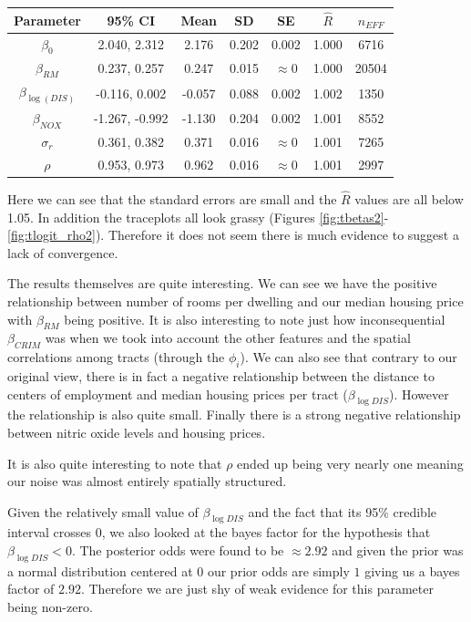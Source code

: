 \documentclass[11pt]{article}
\begin{document}
\begin{center}
\begin{tabular}{ c  | c | c | c | c | c | c}
\hline
 Parameter & 95\% CI & Mean & SD & SE & $\hat{R}$ & $n_{EFF}$ \\ 
 \hline
 $\beta_0$ & 2.040,  2.312 & 2.176 & 0.202 & 0.002 & 1.000 & 6716 \\
 $\beta_{RM}$ & 0.237, 0.257 & 0.247 & 0.015 & $\approx 0$ & 1.000 & 20504 \\
 $\beta_{\log{(DIS)}}$ & -0.116, 0.002 & -0.057 & 0.088 & 0.002 & 1.002 & 1350 \\
 $\beta_{NOX}$ & -1.267, -0.992 & -1.130 & 0.204 & 0.002 & 1.001 & 8552 \\
 $\sigma_r$ & 0.361, 0.382 & 0.371 & 0.016 & $\approx 0$ & 1.001 & 7265 \\
 $\rho$ & 0.953, 0.973 & 0.962 & 0.016 & $\approx 0$ & 1.001 & 2997 \\
 \hline
\end{tabular}
\end{center}

Here we can see that the standard errors are small and the $\hat{R}$ values are all below 1.05. In addition the traceplots all look grassy (Figures \ref{fig:tbetas2}-\ref{fig:tlogit_rho2}). Therefore it does not seem there is much evidence to suggest a lack of convergence. \newline

The results themselves are quite interesting. We can see we have the positive relationship between number of rooms per dwelling and our median housing price with $\beta_{RM}$ being positive. It is also interesting to note just how inconsequential $\beta_{CRIM}$ was when we took into account the other features and the spatial correlations among tracts (through the $\phi_i$). We can also see that contrary to our original view, there is in fact a negative relationship between the distance to centers of employment and median housing prices per tract ($\beta_{\log{DIS}}$). However the relationship is also quite small. Finally there is a strong negative relationship between nitric oxide levels and housing prices. 

It is also quite interesting to note that $\rho$ ended up being very nearly one meaning our noise was almost entirely spatially structured. \newline

Given the relatively small value of $\beta_{\log{DIS}}$ and the fact that its 95\% credible interval crosses 0, we also looked at the bayes factor for the hypothesis that $\beta_{\log{DIS}}<0$. The posterior odds were found to be $\approx 2.92$ and given the prior was a normal distribution centered at 0 our prior odds are simply $1$ giving us a bayes factor of $2.92$. Therefore we are just shy of weak evidence for this parameter being non-zero. \newline
\end{document}
